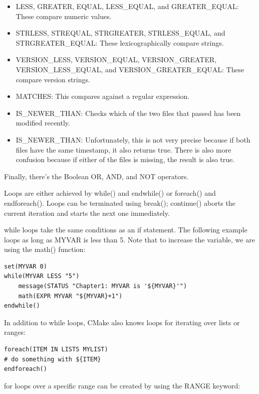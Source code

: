 \begin{itemize}
\item 
LESS, GREATER, EQUAL, LESS\_EQUAL, and GREATER\_EQUAL: These compare numeric values.

\item 
STRLESS, STREQUAL, STRGREATER, STRLESS\_EQUAL, and STRGREATER\_EQUAL: These lexicographically compare strings.

\item 
VERSION\_LESS, VERSION\_EQUAL, VERSION\_GREATER, VERSION\_LESS\_EQUAL, and VERSION\_GREATER\_EQUAL: These compare version strings.

\item 
MATCHES: This compares against a regular expression.

\item 
IS\_NEWER\_THAN: Checks which of the two files that passed has been modified recently.

\item 
IS\_NEWER\_THAN: Unfortunately, this is not very precise because if both files have the same timestamp, it also returns true. There is also more confusion because if either of the files is missing, the result is also true.
\end{itemize}

Finally, there's the Boolean OR, AND, and NOT operators.

Loops are either achieved by while() and endwhile() or foreach() and endforeach(). Loops can be terminated using break(); continue() aborts the current iteration and starts the next one immediately.

while loops take the same conditions as an if statement. The following example loops as long as MYVAR is less than 5. Note that to increase the variable, we are using the math() function:

\begin{lstlisting}[style=styleCMake]
set(MYVAR 0)
while(MYVAR LESS "5")
	message(STATUS "Chapter1: MYVAR is '${MYVAR}'")
	math(EXPR MYVAR "${MYVAR}+1")
endwhile()
\end{lstlisting}

In addition to while loops, CMake also knows loops for iterating over lists or ranges:

\begin{lstlisting}[style=styleCMake]
foreach(ITEM IN LISTS MYLIST)
# do something with ${ITEM}
endforeach()
\end{lstlisting}

for loops over a specific range can be created by using the RANGE keyword:


